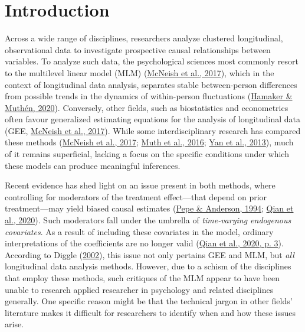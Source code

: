 \documentclass[
  12pt,
  a4paper,
]{article}
\begin{document}
\pagestyle{fancy}
  \fancyhead{}


\newpage

\hypertarget{introduction}{%
\section{Introduction}\label{introduction}}

Across a wide range of disciplines, researchers analyze clustered
longitudinal, observational data to investigate prospective causal
relationships between variables. To analyze such data, the psychological
sciences most commonly resort to the multilevel linear model (MLM)
(\protect\hyperlink{ref-mcneish2017}{McNeish et al., 2017}), which in
the context of longitudinal data analysis, separates stable
between-person differences from possible trends in the dynamics of
within-person fluctuations (\protect\hyperlink{ref-hamaker2020}{Hamaker
\& Muthén, 2020}). Conversely, other fields, such as biostatistics and
econometrics often favour generalized estimating equations for the
analysis of longitudinal data (GEE,
\protect\hyperlink{ref-mcneish2017}{McNeish et al., 2017}). While some
interdisciplinary research has compared these methods
(\protect\hyperlink{ref-mcneish2017}{McNeish et al., 2017};
\protect\hyperlink{ref-muth2016}{Muth et al., 2016};
\protect\hyperlink{ref-yan2013}{Yan et al., 2013}), much of it remains
superficial, lacking a focus on the specific conditions under which
these models can produce meaningful inferences.

Recent evidence has shed light on an issue present in both methods,
where controlling for moderators of the treatment effect---that depend
on prior treatment---may yield biased causal estimates
(\protect\hyperlink{ref-pepe1994}{Pepe \& Anderson, 1994};
\protect\hyperlink{ref-qian2020}{Qian et al., 2020}). Such moderators
fall under the umbrella of \emph{time-varying endogenous covariates}. As
a result of including these covariates in the model, ordinary
interpretations of the coefficients are no longer valid
(\protect\hyperlink{ref-qian2020}{Qian et al., 2020, p. 3}). According
to Diggle (\protect\hyperlink{ref-diggle2002}{2002}), this issue not
only pertains GEE and MLM, but \emph{all} longitudinal data analysis
methods. However, due to a schism of the disciplines that employ these
methods, such critiques of the MLM appear to have been unable to
research applied researcher in psychology and related disciplines
generally. One specific reason might be that the technical jargon in
other fields' literature makes it difficult for researchers to identify
when and how these issues arise.
\end{document}

